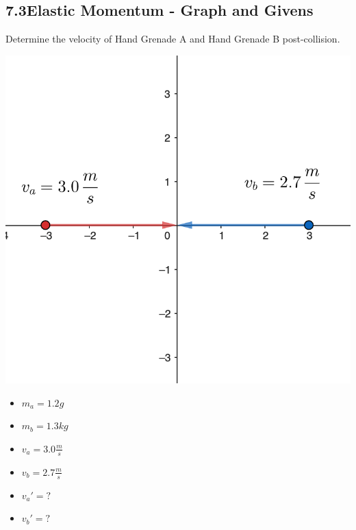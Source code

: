 \documentclass{article}
\begin{document}
\begin{adjustwidth}{1cm}{0pt}
    \subsection*{7.3\hspace*{0.5cm}Elastic Momentum - Graph and Givens}
    Determine the velocity of Hand Grenade A and Hand Grenade B post-collision.\newline\newline
    \begin{minipage}{0.5\textwidth}
        \includegraphics[scale=0.33]{./images/elastic_collision}
    \end{minipage}
    \begin{minipage}{0.5\textwidth}
        \begin{itemize}
            \item $m_{a} = 1.2g$
            \item $m_{b} = 1.3kg$
            \item $v_{a} = 3.0\frac{m}{s}$
            \item $v_{b} = 2.7\frac{m}{s}$
            \item $v_{a}\prime = ?$
            \item $v_{b}\prime = ?$
        \end{itemize}
    \end{minipage}

\end{adjustwidth}
\end{document}
